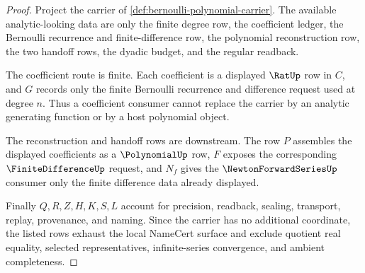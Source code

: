 \begin{proof}
Project the carrier of \autoref{def:bernoulli-polynomial-carrier}. The available analytic-looking data are only the finite degree row, the coefficient ledger, the Bernoulli recurrence and finite-difference row, the polynomial reconstruction row, the two handoff rows, the dyadic budget, and the regular readback.

The coefficient route is finite. Each coefficient is a displayed $\RatUp$ row in $C$, and $G$ records only the finite Bernoulli recurrence and difference request used at degree $n$. Thus a coefficient consumer cannot replace the carrier by an analytic generating function or by a host polynomial object.

The reconstruction and handoff rows are downstream. The row $P$ assembles the displayed coefficients as a $\PolynomialUp$ row, $F$ exposes the corresponding $\FiniteDifferenceUp$ request, and $N_f$ gives the $\NewtonForwardSeriesUp$ consumer only the finite difference data already displayed.

Finally $Q,R,Z,H,K,S,L$ account for precision, readback, sealing, transport, replay, provenance, and naming. Since the carrier has no additional coordinate, the listed rows exhaust the local NameCert surface and exclude quotient real equality, selected representatives, infinite-series convergence, and ambient completeness.
\end{proof}

